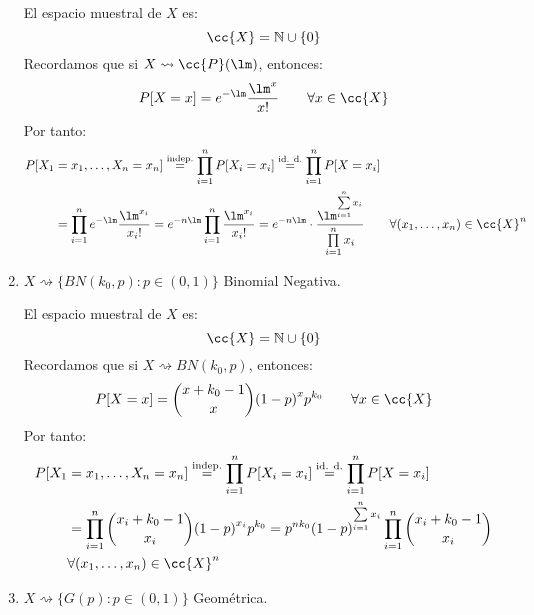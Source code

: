 \begin{ejercicio}
\begin{enumerate}[label=\alph*)]
            El espacio muestral de $X$ es:
            \begin{equation*}
                \cc{X} = \mathbb{N} \cup \{0\}
            \end{equation*} 
            Recordamos que si $X\rightsquigarrow \cc{P}(\lm)$, entonces:
            \begin{equation*}
                P[X=x] = e^{-\lm} \dfrac{\lm^x}{x!} \qquad \forall x\in \cc{X}
            \end{equation*}
            Por tanto:
            \begin{align*}
                P[X_1 &= x_1, \ldots, X_n = x_n] \stackrel{\text{indep.}}{=} \prod_{i=1}^{n}P[X_i = x_i]\stackrel{\text{id. d.}}{=} \prod_{i=1}^{n} P[X=x_i] \\
                      &= \prod_{i=1}^{n} e^{-\lm} \dfrac{\lm^{x_i}}{x_i!} = e^{-n\lm} \prod_{i=1}^{n} \dfrac{\lm^{x_i}}{x_i!} = e^{-n\lm} \cdot \dfrac{\lm^{\sum\limits_{i=1}^n x_i}}{\prod\limits_{i=1}^{n}x_i}  \qquad \forall (x_1, \ldots, x_n) \in \cc{X}^n
            \end{align*}
        \item $X\rightsquigarrow\{BN(k_0,p) : p\in (0,1)\}$ Binomial Negativa.

            El espacio muestral de $X$ es:
            \begin{equation*}
                \cc{X} = \mathbb{N}\cup \{0\}
            \end{equation*}
            Recordamos que si $X\rightsquigarrow BN(k_0,p)$, entonces:
            \begin{equation*}
                P[X=x] = \binom{x+k_0-1}{x} {(1-p)}^{x}p^{k_0} \qquad \forall x\in \cc{X}
            \end{equation*}
            Por tanto:
            \begin{align*}
                P[X_1 &= x_1, \ldots, X_n = x_n] \stackrel{\text{indep.}}{=} \prod_{i=1}^{n}P[X_i = x_i]\stackrel{\text{id. d.}}{=} \prod_{i=1}^{n} P[X=x_i] \\
                      &= \prod_{i=1}^{n} \binom{x_i+k_0-1}{x_i}{(1-p)}^{x_i}p^{k_0} = p^{nk_0}{(1-p)}^{\sum\limits_{i=1}^n x_i} \prod_{i=1}^{n}\binom{x_i+k_0-1}{x_i} \\
                      &\forall (x_1,\ldots,x_n)\in \cc{X}^n
            \end{align*}
        \item $X\rightsquigarrow\{G(p) : p\in (0,1)\}$ Geométrica.


\end{enumerate}
\end{ejercicio}

